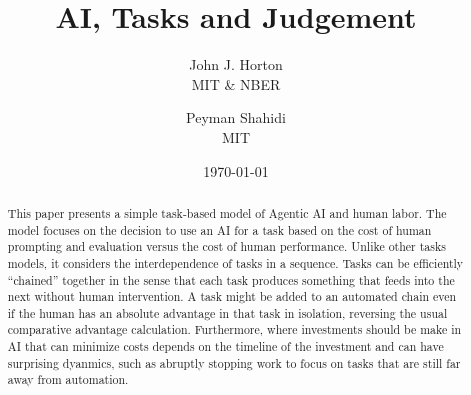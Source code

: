 \documentclass{article}
\theoremstyle{plain}
\theoremstyle{plain}
\begin{document}
\title{AI, Tasks and Judgement}
\author{\normalsize John J. Horton  \\ \normalsize MIT \& NBER  \and \normalsize Peyman Shahidi \\  \normalsize MIT}
\date{\today{}}



\newcommand{\machine}[1]{\langle #1 \rangle}
\newcommand{\human}[1]{( #1 )}
\newcommand{\cost}[1]{C\{ #1 \}}
\newcommand{\costdo}[1]{C_H\{ #1 \}}
\newcommand{\costmanage}[1]{C_M\{ #1 \}}
\newcommand{\tasktime}[1]{t_{#1}}
\newcommand{\taskhc}[1]{c_{#1}}
\newcommand{\labor}[1]{l_{#1}}

\newcommand{\topic}[1]{\paragraph{#1}}

\renewcommand{\arraystretch}{1.75} %

\maketitle

\begin{abstract}
\noindent This paper presents a simple task-based model of Agentic AI and human labor.
The model focuses on the decision to use an AI for a task based on the cost of human prompting and evaluation versus the cost of human performance. 
Unlike other tasks models, it considers the interdependence of tasks in a sequence. 
Tasks can be efficiently ``chained'' together in the sense that each task produces something that feeds into the next without human intervention.
A task might be added to an automated chain even if the human has an absolute advantage in that task in isolation, reversing the usual comparative advantage calculation.
Furthermore, where investments should be make in AI that can minimize costs depends on the timeline of the investment and can have surprising dyanmics, such as abruptly stopping work to focus on tasks that are still far away from automation.
\end{abstract}

\onehalfspacing
  
\end{document}
